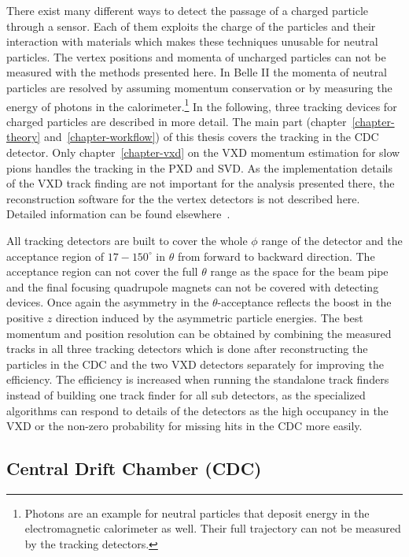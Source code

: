 There exist many different ways to detect the passage of a charged particle through a sensor. Each of them exploits the charge of the particles and their interaction with materials which makes these techniques unusable for neutral particles. The vertex positions and momenta of uncharged particles can not be measured with the methods presented here. In Belle II the momenta of neutral particles are resolved by assuming momentum conservation or by measuring the energy of photons in the calorimeter.\footnote{Photons are an example for neutral particles that deposit energy in the electromagnetic calorimeter as well. Their full trajectory can not be measured by the tracking detectors.} In the following, three tracking devices for charged particles are described in more detail. The main part (chapter~\ref{chapter-theory} and~\ref{chapter-workflow}) of this thesis covers the tracking in the CDC detector. Only chapter~\ref{chapter-vxd} on the VXD momentum estimation for slow pions handles the tracking in the PXD and SVD.  As the implementation details of the VXD track finding are not important for the analysis presented there, the reconstruction software for the the vertex detectors is not described here. Detailed information can be found elsewhere~\cite{jakob}.

All tracking detectors are built to cover the whole $\phi$ range of the detector and the acceptance region of $17-150 ^\circ$ in $\theta$ from forward to backward direction. The acceptance region can not cover the full $\theta$ range as the space for the beam pipe and the final focusing quadrupole magnets can not be covered with detecting devices. Once again the asymmetry in the $\theta$-acceptance reflects the boost in the positive $z$ direction induced by the asymmetric particle energies. The best momentum and position resolution can be obtained by combining the measured tracks in all three tracking detectors which is done after reconstructing the particles in the CDC and the two VXD detectors separately for improving the efficiency. The efficiency is increased when running the standalone track finders instead of building one track finder for all sub detectors, as the specialized algorithms can respond to details of the detectors as the high occupancy in the VXD or the non-zero probability for missing hits in the CDC more easily. 

\subsection{Central Drift Chamber (CDC)}

